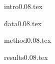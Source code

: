 \documentclass[useAMS,usenatbib]{mn2e}
\begin{document}

{intro0.08.tex}

{data0.08.tex}


{method0.08.tex}

{results0.08.tex}
\end{document}
